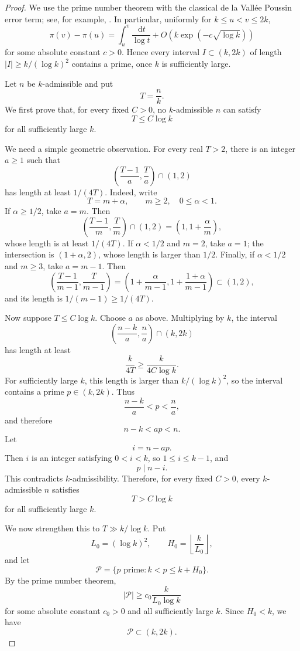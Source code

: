 \documentclass[11pt]{article}
\newcommand{\dd}{\,\mathrm d}
\begin{document}
\begin{proof}
We use the prime number theorem with the classical de la Vall\'ee Poussin error
term; see, for example, \cite[Chapter 15]{Davenport}. In particular, uniformly for \(k\le u<v\le 2k\),
\[
        \pi(v)-\pi(u)
        =
        \int_u^v \frac{\dd t}{\log t}
        +
        O\!\left(k\exp(-c\sqrt{\log k})\right)
\]
for some absolute constant \(c>0\). Hence every interval
\(I\subset(k,2k)\) of length \(|I|\ge k/(\log k)^2\) contains a prime, once
\(k\) is sufficiently large.

Let \(n\) be \(k\)-admissible and put
\[
        T=\frac nk .
\]
We first prove that, for every fixed \(C>0\), no \(k\)-admissible \(n\) can
satisfy
\[
        T\le C\log k
\]
for all sufficiently large \(k\).

We need a simple geometric observation. For every real \(T>2\), there is an
integer \(a\ge1\) such that
\[
        \left(\frac{T-1}{a},\frac{T}{a}\right)\cap(1,2)
\]
has length at least \(1/(4T)\). Indeed, write
\[
        T=m+\alpha,
        \qquad
        m\ge2,
        \quad
        0\le\alpha<1 .
\]
If \(\alpha\ge1/2\), take \(a=m\). Then
\[
        \left(\frac{T-1}{m},\frac{T}{m}\right)\cap(1,2)
        =
        \left(1,1+\frac{\alpha}{m}\right),
\]
whose length is at least \(1/(4T)\). If \(\alpha<1/2\) and \(m=2\), take
\(a=1\); the intersection is \((1+\alpha,2)\), whose length is larger than
\(1/2\). Finally, if \(\alpha<1/2\) and \(m\ge3\), take \(a=m-1\). Then
\[
        \left(\frac{T-1}{m-1},\frac{T}{m-1}\right)
        =
        \left(
        1+\frac{\alpha}{m-1},
        1+\frac{1+\alpha}{m-1}
        \right)
        \subset (1,2),
\]
and its length is \(1/(m-1)\ge1/(4T)\).

Now suppose \(T\le C\log k\). Choose \(a\) as above. Multiplying by \(k\), the
interval
\[
        \left(\frac{n-k}{a},\frac{n}{a}\right)\cap(k,2k)
\]
has length at least
\[
        \frac{k}{4T}
        \ge
        \frac{k}{4C\log k}.
\]
For sufficiently large \(k\), this length is larger than \(k/(\log k)^2\), so
the interval contains a prime \(p\in(k,2k)\). Thus
\[
        \frac{n-k}{a}<p<\frac{n}{a},
\]
and therefore
\[
        n-k<ap<n .
\]
Let
\[
        i=n-ap .
\]
Then \(i\) is an integer satisfying \(0<i<k\), so \(1\le i\le k-1\), and
\[
        p\mid n-i .
\]
This contradicts \(k\)-admissibility. Therefore, for every fixed \(C>0\),
every \(k\)-admissible \(n\) satisfies
\[
        T>C\log k
\]
for all sufficiently large \(k\).

We now strengthen this to \(T\gg k/\log k\). Put
\[
        L_0=(\log k)^2,
        \qquad
        H_0=\left\lfloor\frac{k}{L_0}\right\rfloor,
\]
and let
\[
        \mathcal P=
        \{p\text{ prime}: k<p\le k+H_0\}.
\]
By the prime number theorem,
\[
        |\mathcal P|\ge c_0\frac{k}{L_0\log k}
\]
for some absolute constant \(c_0>0\) and all sufficiently large \(k\). Since
\(H_0<k\), we have
\[
        \mathcal P\subset(k,2k).
\]


\end{proof}
\end{document}
